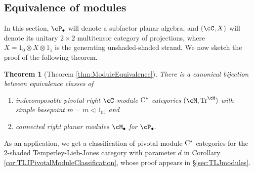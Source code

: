 \documentclass[11pt]{article}
\theoremstyle{plain}
\newtheorem{thm}{Theorem}[section]
\newtheorem*{thm*}{Theorem}
\theoremstyle{definition}
\DeclareMathOperator{\Tr}{Tr}
\newcommand{\Cstar}{\rm{C^*}}
\newcommand{\nn}[1]{\textcolor{red}{[[#1]]}}
\begin{document}
\subsection{Equivalence of modules}

In this section, $\cP_\bullet$ will denote a subfactor planar algebra, and $(\cC, X)$ will denote its unitary $2\times 2$ multitensor category of projections, where $X = 1_0 \otimes X \otimes 1_1$ is the generating unshaded-shaded strand.
We now sketch the proof of the following theorem.

\begin{thm*}[Theorem \ref{thm:ModuleEquivalence}]
There is a canonical bijection between equivalence classes of
\begin{enumerate}[label={\rm(\arabic*)}]
\item
indecomposable pivotal right $\cC$-module $\Cstar$ categories $(\cM,\Tr^\cM)$ with simple basepoint $m = m\vartriangleleft 1_0$, and
\item
connected right planar modules $\cM_\bullet$ for $\cP_\bullet$.
\end{enumerate}
\end{thm*}

As an application, we get a classification of pivotal module $\Cstar$ categories for the 2-shaded Temperley-Lieb-Jones category with parameter $d$ in Corollary \ref{cor:TLJPivotalModuleClassification}, whose proof appears in \S\ref{sec:TLJmodules}.

%

\end{document}

